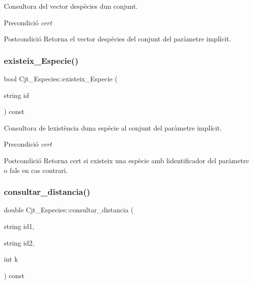 Consultora del vector d\textquotesingle{}espècies d\textquotesingle{}un conjunt. 

\begin{DoxyPrecond}{Precondició}
{\itshape cert} 
\end{DoxyPrecond}
\begin{DoxyPostcond}{Postcondició}
Retorna el vector d\textquotesingle{}espècies del conjunt del paràmetre implícit. 
\end{DoxyPostcond}
\mbox{\label{class_cjt___especies_acd5a61de448f77d0356e0ba8d642b2e0}} 
\subsubsection{\texorpdfstring{existeix\+\_\+\+Especie()}{existeix\_Especie()}}
{\footnotesize\ttfamily bool Cjt\+\_\+\+Especies\+::existeix\+\_\+\+Especie (\begin{DoxyParamCaption}\item[{string}]{id }\end{DoxyParamCaption}) const}



Consultora de l\textquotesingle{}existència d\textquotesingle{}una espècie al conjunt del paràmetre implícit. 

\begin{DoxyPrecond}{Precondició}
{\itshape cert} 
\end{DoxyPrecond}
\begin{DoxyPostcond}{Postcondició}
Retorna cert si existeix una espècie amb l\textquotesingle{}identificador del paràmetre o fals en cas contrari. 
\end{DoxyPostcond}
\mbox{\label{class_cjt___especies_a137955c8c38747252290ea1fc26cd012}} 
\subsubsection{\texorpdfstring{consultar\+\_\+distancia()}{consultar\_distancia()}}
{\footnotesize\ttfamily double Cjt\+\_\+\+Especies\+::consultar\+\_\+distancia (\begin{DoxyParamCaption}\item[{string}]{id1,  }\item[{string}]{id2,  }\item[{int}]{k }\end{DoxyParamCaption}) const}



